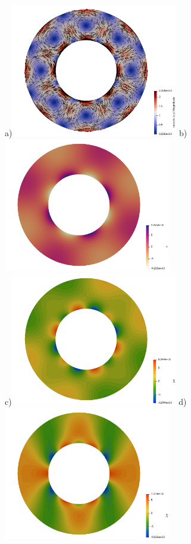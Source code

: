 \newpage
\begin{center}
a)\includegraphics[width=7.3cm]{python_codes/fieldstone_21/RESULTS/vel}
b)\includegraphics[width=7.3cm]{python_codes/fieldstone_21/RESULTS/q}\\
c)\includegraphics[width=7.3cm]{python_codes/fieldstone_21/RESULTS/Lxx}
d)\includegraphics[width=7.3cm]{python_codes/fieldstone_21/RESULTS/Lxy}\\

\end{center}
